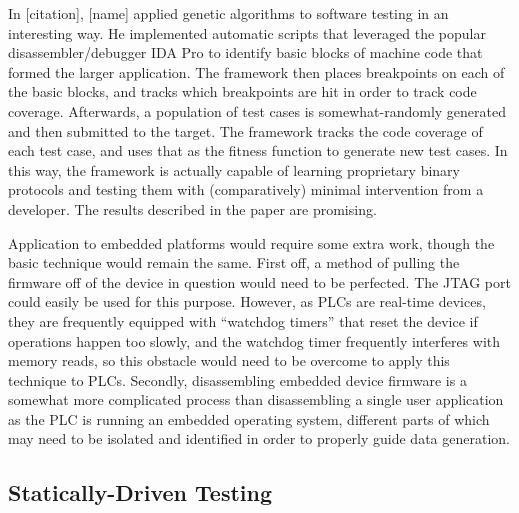 \documentclass{report}
\begin{document}
In [citation], [name] applied genetic algorithms to software testing in an interesting way. He implemented automatic scripts that leveraged
the popular disassembler/debugger IDA Pro to identify basic blocks of machine code that formed the larger application. The framework then places breakpoints on each of the
basic blocks, and tracks which breakpoints are hit in order to track code coverage. Afterwards, a population of test cases is somewhat-randomly generated and then
submitted to the target. The framework tracks the code coverage of each test case, and uses that as the fitness function to generate new test cases. In this way,
the framework is actually capable of learning proprietary binary protocols and testing them with (comparatively) minimal intervention from a developer. The results
described in the paper are promising.

Application to embedded platforms would require some extra work, though the basic technique would remain the same. First off, a method of pulling the firmware off of
the device in question would need to be perfected. The JTAG port could easily be used for this purpose. However, as PLCs are real-time devices, they are frequently
equipped with ``watchdog timers'' that reset the device if operations happen too slowly, and the watchdog timer frequently interferes with memory reads, so this obstacle
would need to be overcome to apply this technique to PLCs. Secondly, disassembling embedded device firmware is a somewhat more complicated process than disassembling
a single user application as the PLC is running an embedded operating system, different parts of which may need to be isolated and identified in order to properly
guide data generation.
\subsection{Statically-Driven Testing}
\end{document}
